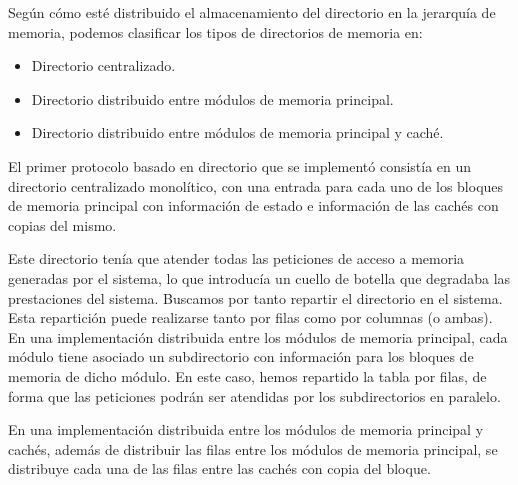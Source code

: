 Según cómo esté distribuido el almacenamiento del directorio en la jerarquía de memoria, podemos clasificar los tipos de directorios de memoria en:
\begin{itemize}
    \item Directorio centralizado.
    \item Directorio distribuido entre módulos de memoria principal.
    \item Directorio distribuido entre módulos de memoria principal y caché.
\end{itemize}
El primer protocolo basado en directorio que se implementó consistía en un directorio centralizado monolítico, con una entrada para cada uno de los bloques de memoria principal con información de estado e información de las cachés con copias del mismo.

Este directorio tenía que atender todas las peticiones de acceso a memoria generadas por el sistema, lo que introducía un cuello de botella que degradaba las prestaciones del sistema. Buscamos por tanto repartir el directorio en el sistema. Esta repartición puede realizarse tanto por filas como por columnas (o ambas).\\

En una implementación distribuida entre los módulos de memoria principal, cada módulo tiene asociado un subdirectorio con información para los bloques de memoria de dicho módulo. En este caso, hemos repartido la tabla por filas, de forma que las peticiones podrán ser atendidas por los subdirectorios en paralelo.

En una implementación distribuida entre los módulos de memoria principal y cachés, además de distribuir las filas entre los módulos de memoria principal, se distribuye cada una de las filas entre las cachés con copia del bloque.

